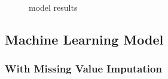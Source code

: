 \documentclass[
]{article}
\begin{document}
\begin{figure}[H]

{\centering {}

}

\caption{model results}\label{fig:ts2}
\end{figure}

\subsection{Machine Learning Model}\label{machine-learning-model}

\subsubsection{With Missing Value Imputation}\label{with-missing-value-imputation-1}
\end{document}
